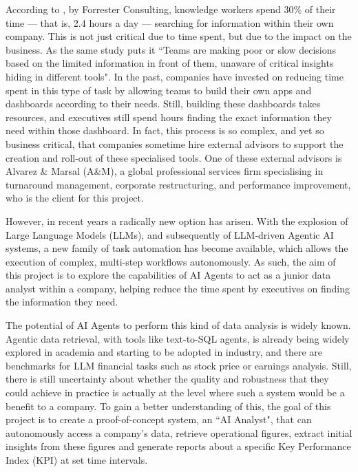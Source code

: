 \documentclass[a4paper]{report}
\begin{document}
According to \cite{forrester2022}, by Forrester Consulting, knowledge workers spend 30\% of their time --- that is, 2.4 hours a day --- searching for information within their own company. This is not just critical due to time spent, but due to the impact on the business. As the same study puts it ``Teams are making poor or slow decisions based on the limited information in front of them, unaware of critical insights hiding in different tools". In the past, companies have invested on reducing time spent in this type of task by allowing teams to build their own apps and dashboards according to their needs. Still, building these dashboards takes resources, and executives still spend hours finding the exact information they need within those dashboard. In fact, this process is so complex, and yet so business critical, that companies sometime hire external advisors to support the creation and roll-out of these specialised tools. One of these external advisors is Alvarez \& Marsal (A\&M), a global professional services firm specialising in turnaround management, corporate restructuring, and performance improvement, who is the client for this project.

However, in recent years a radically new option has arisen. With the explosion of Large Language Models (LLMs), and subsequently of LLM-driven Agentic AI systems, a new family of task automation has become available, which allows the execution of complex, multi-step workflows autonomously. As such, the aim of this project is to explore the capabilities of AI Agents to act as a junior data analyst within a company, helping reduce the time spent by executives on finding the information they need.

The potential of AI Agents to perform this kind of data analysis is widely known. Agentic data retrieval, with tools like text-to-SQL agents, is already being widely explored in academia and starting to be adopted in industry, and there are benchmarks for LLM financial tasks such as stock price or earnings analysis. Still, there is still uncertainty about whether the quality and robustness that they could achieve in practice is actually at the level where such a system would be a benefit to a company. To gain a better understanding of this, the goal of this project is to create a proof-of-concept system, an ``AI Analyst", that can autonomously access a company's data, retrieve operational figures, extract initial insights from these figures and generate reports about a specific Key Performance Index (KPI) at set time intervals.
\end{document}
